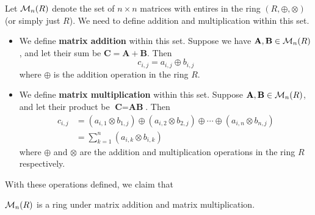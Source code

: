 Let $\mathcal{M}_{n}(R)$ denote the set of $n\times n$ matrices with entires in the ring $(R, \oplus, \otimes)$ (or simply just $R$).
We need to define addition and multiplication within this set.
\begin{itemize}
    \item We define \textbf{matrix addition} within this set. Suppose we have $\textbf{A}, \textbf{B} \in \mathcal{M}_{n}(R)$, and let their sum be $\textbf{C} = \textbf{A} + \textbf{B}$. Then
    \[
        c_{i,j} = a_{i,j} \oplus b_{i,j}    
    \]
    where $\oplus$ is the addition operation in the ring $R$.
    
    \item We define \textbf{matrix multiplication} within this set. Suppose $\textbf{A}, \textbf{B} \in \mathcal{M}_{n}(R)$, and let their product be $\textbf{C} = \textbf{AB}$. Then
    \begin{align*}
        c_{i,j} &= (a_{i,1}\otimes b_{1,j}) \oplus (a_{i,2}\otimes b_{2,j}) \oplus \cdots \oplus (a_{i,n}\otimes b_{n,j})\\
        &= \sum_{k=1}^n (a_{i,k}\otimes b_{i,k})
    \end{align*}
    where $\oplus$ and $\otimes$ are the addition and multiplication operations in the ring $R$ respectively.
\end{itemize}
With these operations defined, we claim that
\begin{proposition}
    $\mathcal{M}_{n}(R)$ is a ring under matrix addition and matrix multiplication.
\end{proposition}
